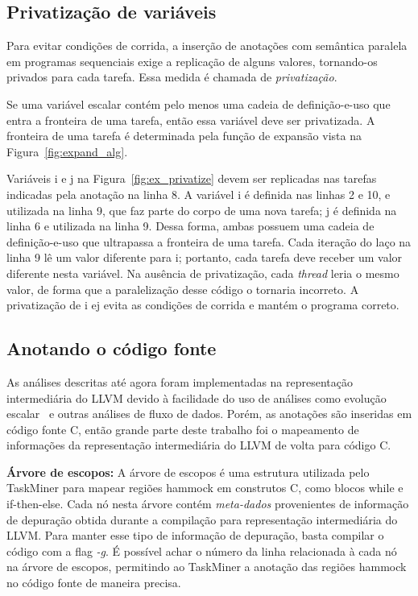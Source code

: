 \documentclass[sigplan,10pt,review]{acmart}
\newcommand\Taskminer{\mbox{\textsf{TaskMiner}}}
\begin{document}
\subsection{Privatização de variáveis}
\label{sub:variance}

Para evitar condições de corrida, a inserção de anotações com semântica paralela
em programas sequenciais exige a replicação de alguns valores, tornando-os privados para cada tarefa.
Essa medida é chamada de {\em privatização}.

Se uma variável escalar contém pelo menos uma cadeia de definição-e-uso que entra
a fronteira de uma tarefa, então essa variável deve ser privatizada. A fronteira de uma 
tarefa é determinada pela função de expansão vista na Figura~\ref{fig:expand_alg}.

\begin{example}[Privatização]
\label{ex:priv}
Variáveis \textsf{i} e \textsf{j} na Figura~\ref{fig:ex_privatize} devem ser replicadas
nas tarefas indicadas pela anotação na linha 8.
A variável \textsf{i} é definida nas linhas 2 e 10, e utilizada na linha 9, que faz
parte do corpo de uma nova tarefa; \textsf{j} é definida na linha 6 e utilizada na linha 9.
Dessa forma, ambas possuem uma cadeia de definição-e-uso que ultrapassa a fronteira
de uma tarefa. Cada iteração do laço na linha 9 lê um valor diferente para \textsf{i}; portanto,
cada tarefa deve receber um valor diferente nesta variável. Na ausência de privatização, cada {\em thread}
leria o mesmo valor, de forma que a paralelização desse código o tornaria incorreto.
A privatização de \textsf{i} e\textsf{j} evita as condições de corrida e mantém o programa correto.
\end{example}

\subsection{Anotando o código fonte}
\label{sub:ir}

As análises descritas até agora foram implementadas na representação intermediária
do LLVM devido à facilidade do uso de análises como evolução escalar~\cite[p.18]{Grosser12} e outras
análises de fluxo de dados.
Porém, as anotações são inseridas em código fonte C, então grande
parte deste trabalho foi o mapeamento de informações da representação intermediária do LLVM de volta
para código C.

\noindent
\textbf{Árvore de escopos:}
A árvore de escopos é uma estrutura utilizada pelo {\Taskminer} para mapear regiões hammock em construtos C, como blocos
\textsf{while} e \textsf{if-then-else}. Cada nó nesta árvore contém {\em meta-dados}
provenientes de informação de depuração obtida durante a compilação para representação
intermediária do LLVM. Para manter esse tipo de informação de depuração, basta compilar o código com a flag
{\em -g}.
É possível achar o número da linha relacionada à cada nó na árvore de escopos, permitindo
ao {\Taskminer} a anotação das regiões hammock no código fonte de maneira precisa.
\end{document}
